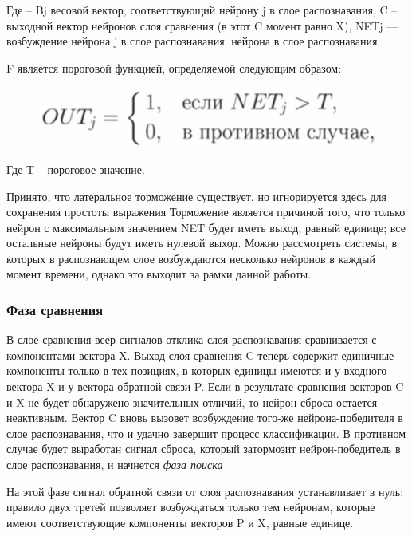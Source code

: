 \documentclass[14pt,a4paper,report]{article}
\begin{document}
Где -- Bj весовой вектор, соответствующий нейрону j в слое распознавания, C -- выходной вектор нейронов слоя сравнения (в этот C момент равно X), NETj — возбуждение нейрона j в слое распознавания. 
нейрона в слое распознавания.

F является пороговой функцией, определяемой следующим образом:

\begin{figure}[h!]
	\centering
	\includegraphics[scale = 0.55]{images/f_5.png}
\end{figure}

Где T -- пороговое значение.

Принято, что латеральное торможение существует, но игнорируется здесь для сохранения простоты выражения \cite{cite-kgeu-adapt} Торможение является причиной того, что только нейрон с максимальным значением NET будет иметь выход, равный единице; все остальные нейроны будут иметь нулевой выход. Можно рассмотреть системы, в которых в распознающем слое возбуждаются несколько нейронов в каждый момент времени, однако это выходит за рамки данной работы.

\subsubsection{Фаза сравнения}

В слое сравнения веер сигналов отклика слоя распознавания сравнивается с компонентами вектора X. Выход слоя сравнения C теперь содержит единичные компоненты только в тех позициях, в которых единицы имеются и у входного вектора X и у вектора обратной связи P. Если в результате сравнения векторов C и X не будет обнаружено значительных отличий, то нейрон сброса остается неактивным. Вектор C вновь вызовет возбуждение того-же нейрона-победителя в слое распознавания, что и удачно завершит процесс классификации. В противном случае будет выработан сигнал сброса, который затормозит нейрон-победитель в слое распознавания, и начнется \textit{фаза поиска} \cite{cite-lek-narod}

На этой фазе сигнал обратной связи от слоя распознавания устанавливает в нуль; правило двух третей позволяет возбуждаться только тем нейронам, которые имеют соответствующие компоненты векторов P и X, равные единице. 
\end{document}
